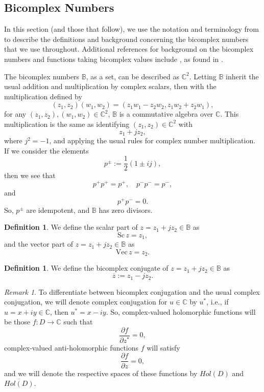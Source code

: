 \documentclass[suppldata]{interact}
\theoremstyle{plain}%
\theoremstyle{definition}
\newtheorem{deff}[theorem]{Definition}
\theoremstyle{remark}
\newtheorem{comm}{Remark}
\newcommand{\C}{\mathbb C}
\newcommand{\p}{\partial}
\newcommand{\bc}{\mathbb{B}}
\newcommand{\sca}{\text{Sc}\,}
\newcommand{\vect}{\text{Vec}\,}
\begin{document}
\subsection{Bicomplex Numbers}

In this section (and those that follow), we use the notation and terminology from \cite{BCTransmutation, BCBergman} to describe the definitions and background concerning the bicomplex numbers that we use throughout. Additional references for background on the bicomplex numbers and functions taking bicomplex values include \cite{FundBicomplex, BicomplexHilbert, KravAPFT, BCHolo, ComplexSchr}, as found in \cite{BCTransmutation, BCBergman}. 



The bicomplex numbers $\bc$, as a set, can be described as $\C^2$. Letting $\bc$ inherit the usual addition and multiplication by complex scalars, then with the multiplication defined by 
\[
    (z_1, z_2)(w_1,w_2) = (z_1w_1 - z_2w_2, z_1w_2 + z_2 w_1),
\]
for any $(z_1,z_2), (w_1,w_2) \in \C^2$, $\bc$ is a commutative algebra over $\C$. This multiplication is the same as identifying $(z_1, z_2) \in \C^2$ with 
\[
    z_1 + j z_2,
\]  
where $j^2 = -1$, and applying the usual rules for complex number multiplication. If we consider the elements 
\[
    p^{\pm} := \frac{1}{2}(1\pm ij),
\]
then we see that 
\[
p^+ p^+ = p^+,\quad p^- p^- = p^-, 
\]
and
\[
    p^+ p^- = 0.
\]
So, $p^\pm$ are idempotent, and $\bc$ has zero divisors.

\begin{deff}
    We define the scalar part of $z = z_1 + jz_2 \in \bc$ as 
    \[
        \sca z = z_1,
    \]
    and the vector part of $z = z_1 + jz_2 \in \bc$ as 
    \[
        \vect z = z_2.
    \]
\end{deff}

\begin{deff}
    We define the bicomplex conjugate of $z = z_1 + jz_2 \in \bc$ as 
    \[
        \overline{z} := z_1 - jz_2.
    \]
\end{deff}

\begin{comm}
    To differentiate between bicomplex conjugation and the usual complex conjugation, we will denote complex conjugation for $u \in \mathbb{C}$ by $u^*$, i.e., if $u = x + iy \in \C$, then $u^* = x - i y$. So, complex-valued holomorphic functions will be those $f: D \to \C$ such that 
    \[
        \frac{\p f}{\p z^*} = 0,
    \]
    complex-valued anti-holomorphic functions $f$ will satisfy 
    \[
        \frac{\p f}{\p z} = 0,
    \]
    and we will denote the respective spaces of these functions by $Hol(D)$ and $\overline{Hol(D)}$. 
\end{comm}
\end{document}
